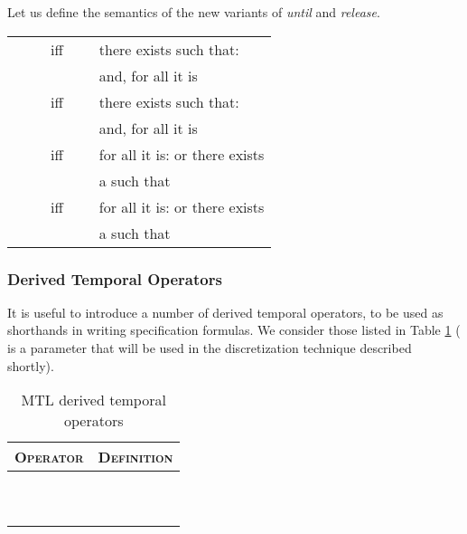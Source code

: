 \documentclass[a4paper]{article}
\theoremstyle{plain}
\theoremstyle{definition}
\begin{document}
Let us define the semantics of the new variants of \emph{until} and \emph{release}. \\
\begin{tabular}{l c l}
   & \ \ \ iff\ \ \ &
            there exists  such that:   \\
  &  &      and, for all  it is   \\

   & \ \ \ iff\ \ \ &
            there exists  such that:   \\
  &  &      and, for all  it is   \\









   & \ \ \ iff\ \ \ &
            for all  it is:  or there exists \\
  &  &       a  such that   \\

   & \ \ \ iff\ \ \ &
            for all  it is:  or there exists \\
  &  &       a  such that 
\end{tabular}



\subsubsection{Derived Temporal Operators}
It is useful to introduce a number of derived temporal operators, to be used as shorthands in writing specification formulas.
We consider those listed in Table \ref{tab:mtl-derived} ( is a parameter that will be used in the discretization technique described shortly).

\begin{table}[htb]
\begin{center}
  \begin{tabular}{|c @{} c|}
	 \hline
    \textsc{Operator}        & \textsc{Definition}  \\
    \hline
	     &     \\
	     &    \\
	     &    \\
	     &    \\
         &      \\
         &     \\
	   &   \\
	   &   \\
	  &    \\
	   &   \\
   \hline
  \end{tabular}
  \caption{MTL derived temporal operators}
  \label{tab:mtl-derived}
\end{center}
\end{table}
\end{document}
